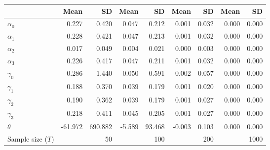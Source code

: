 
\begin{tabular}[t]{lrrrrrrrr}
\toprule
  & Mean & SD & Mean  & SD  & Mean   & SD   & Mean    & SD   \\
\midrule
$\alpha_{0}$ & 0.227 & 0.420 & 0.047 & 0.212 & 0.001 & 0.032 & 0.000 & 0.000\\
$\alpha_{1}$ & 0.228 & 0.421 & 0.047 & 0.213 & 0.001 & 0.032 & 0.000 & 0.000\\
$\alpha_{2}$ & 0.017 & 0.049 & 0.004 & 0.021 & 0.000 & 0.003 & 0.000 & 0.000\\
$\alpha_{3}$ & 0.226 & 0.417 & 0.047 & 0.211 & 0.001 & 0.032 & 0.000 & 0.000\\
$\gamma_{0}$ & 0.286 & 1.440 & 0.050 & 0.591 & 0.002 & 0.057 & 0.000 & 0.000\\
$\gamma_{1}$ & 0.188 & 0.370 & 0.039 & 0.179 & 0.001 & 0.020 & 0.000 & 0.000\\
$\gamma_{2}$ & 0.190 & 0.362 & 0.039 & 0.179 & 0.001 & 0.027 & 0.000 & 0.000\\
$\gamma_{3}$ & 0.218 & 0.411 & 0.045 & 0.205 & 0.001 & 0.027 & 0.000 & 0.000\\
$\theta$ & -61.972 & 690.882 & -5.589 & 93.468 & -0.003 & 0.103 & 0.000 & 0.000\\
Sample size ($T$) &  & 50 &  & 100 &  & 200 &  & 1000\\
\bottomrule
\end{tabular}

